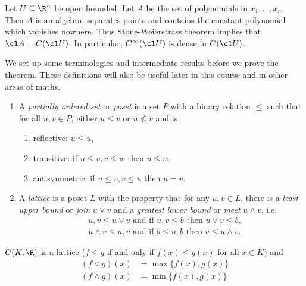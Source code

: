 \documentclass[a4paper]{article}
\begin{document}
\begin{eg}
  Let \(U \subseteq \R^n\) be open bounded. Let \(A\) be the set of polynomials in \(x_1, \dots, x_n\). Then \(A\) is an algebra, separates points and contains the constant polynomial which vanishes nowhere. Thus Stone-Weierstrass theorem implies that \(\cl A = C(\cl U)\). In particular, \(C^\infty(\cl U)\) is dense in \(C(\cl U)\).
\end{eg}

We set up some terminologies and intermediate results before we prove the theorem. These definitions will also be useful later in this course and in other areas of maths. %

\begin{definition}\leavevmode
  \begin{enumerate}
  \item A \emph{partially ordered set} or \emph{poset} is a set \(P\) with a binary relation \(\leq\) such that for all \(u, v \in P\), either \(u \leq v\) or \(u \nleq v\) and is
    \begin{enumerate}
    \item reflective: \(u \leq u\),
    \item transitive: if \(u \leq v, v \leq w\) then \(u \leq w\),
    \item antisymmetric: if \(u \leq v, v \leq u\) then \(u = v\).
    \end{enumerate}
  \item A \emph{lattice} is a poset \(L\) with the property that for any \(u, v \in L\), there is a \emph{least upper bound} or \emph{join} \(u \vee v\) and a \emph{greatest lower bound} or \emph{meet} \(u \wedge v\), i.e.\
    \begin{align*}
      & u, v \leq u \vee v \text{ and if } u, v \leq b \text{ then } u \vee v \leq b, \\
      & u \wedge v \leq u, v \text{ and if } b \leq u, b \text{ then } v \leq u \wedge v.
    \end{align*}
  \end{enumerate}
\end{definition}

\begin{eg}
  \(C(K, \R)\) is a lattice (\(f \leq g\) if and only if \(f(x) \leq g(x)\) for all \(x \in K\)) and
  \begin{align*}
    (f \vee g) (x) &= \max \{f(x), g(x)\} \\
    (f \wedge g) (x) &= \min \{f(x), g(x)\}
  \end{align*}
\end{eg}
\end{document}
